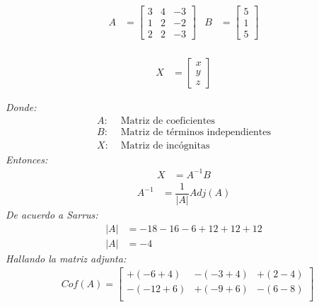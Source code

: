 \documentclass[11pt, a4paper]{article}
\begin{document}
\begin{multicols*}{2}
  \begin{align*}
    A &= \begin{bmatrix}
      3 & 4 & -3\\
      1 & 2 & -2\\
      2 & 2 & -3
    \end{bmatrix}&
    B &= \begin{bmatrix}
      5\\
      1\\
      5
    \end{bmatrix}\\
  \end{align*}
  \vspace{-2cm}
  \begin{center}
    \begin{align*}
      X &= \begin{bmatrix}
        x\\
        y\\
        z
      \end{bmatrix}
    \end{align*}
  \end{center}
  \textit{Donde:}
  \begin{align*}
    A: &\text{ Matriz de coeficientes}\\
    B: &\text{ Matriz de términos independientes}\\
    X: &\text{ Matriz de incógnitas}
  \end{align*}
  \textit{Entonces:}
  \begin{align*}
    X &= A^{-1}B
  \end{align*}
  \begin{align*}
    A^{-1} &= \dfrac{1}{|A|}Adj\left(A\right)
  \end{align*}
  \textit{De acuerdo a Sarrus:}
  \begin{align*}
    |A| &= -18-16-6+12+12+12\\
    |A| &= -4
  \end{align*}
  \textit{Hallando la matriz adjunta:}
  \begin{align*}
    &Cof\left(A\right) = \begin{bmatrix}
      +\left(-6+4\right) & -\left(-3+4\right) & +\left(2-4\right)\\
      -\left(-12+6\right) & +\left(-9+6\right) & -\left(6-8\right)\\

\end{bmatrix}
\end{align*}
\end{multicols*}
\end{document}
